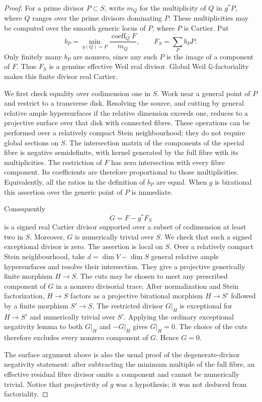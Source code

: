 \begin{proof}
For a prime divisor $P\subset S$, write $m_Q$ for the multiplicity of
$Q$ in $g^*P$, where $Q$ ranges over the prime divisors dominating $P$.
These multiplicities may be computed over the smooth generic locus of
$P$, where $P$ is Cartier. Put
\[
 b_P=\min_{g(Q)=P}\frac{\operatorname{coeff}_Q F}{m_Q},
 \qquad F_S=\sum_P b_PP.
\]
Only finitely many $b_P$ are nonzero, since any such $P$ is the image of
a component of $F$. Thus $F_S$ is a genuine effective Weil real divisor.
Global Weil $\mathbb{Q}$-factoriality makes this finite divisor real
Cartier.

We first check equality over codimension one in $S$. Work near a
general point of $P$ and restrict to a transverse disk. Resolving the
source, and cutting by general relative ample hypersurfaces if the
relative dimension exceeds one, reduces to a projective surface over
that disk with connected fibres. These operations can be performed
over a relatively compact Stein neighbourhood; they do not require
global sections on $S$. The intersection matrix of the components of
the special fibre is negative semidefinite, with kernel generated by
the full fibre with its multiplicities. The restriction of $F$ has
zero intersection with every fibre component. Its coefficients are
therefore proportional to those multiplicities. Equivalently, all the
ratios in the definition of $b_P$ are equal. When $g$ is birational this
assertion over the generic point of $P$ is immediate.

Consequently
\[
                              G=F-g^*F_S
\]
is a signed real Cartier divisor supported over a subset of codimension
at least two in $S$. Moreover, $G$ is numerically trivial over $S$.
We check that such a signed exceptional divisor is zero. The assertion
is local on $S$. Over a relatively compact Stein neighbourhood, take
$d=\dim V-\dim S$ general relative ample hypersurfaces and resolve their
intersection. They give a projective generically finite morphism
$H\to S$. The cuts may be chosen to meet any prescribed component of
$G$ in a nonzero divisorial trace. After normalization and Stein
factorization, $H\to S$ factors as a projective birational morphism
$H\to S'$ followed by a finite morphism $S'\to S$. The restricted
divisor $G|_H$ is exceptional for $H\to S'$ and numerically trivial
over $S'$. Applying the ordinary exceptional negativity lemma to both
$G|_H$ and $-G|_H$ gives $G|_H=0$. The choice of the cuts therefore
excludes every nonzero component of $G$. Hence $G=0$.

The surface argument above is also the usual proof of the
degenerate-divisor negativity statement: after subtracting the minimum
multiple of the full fibre, an effective residual fibre divisor omits
a component and cannot be numerically trivial. Notice that projectivity
of $g$ was a hypothesis; it was not deduced from factoriality.
\end{proof}

